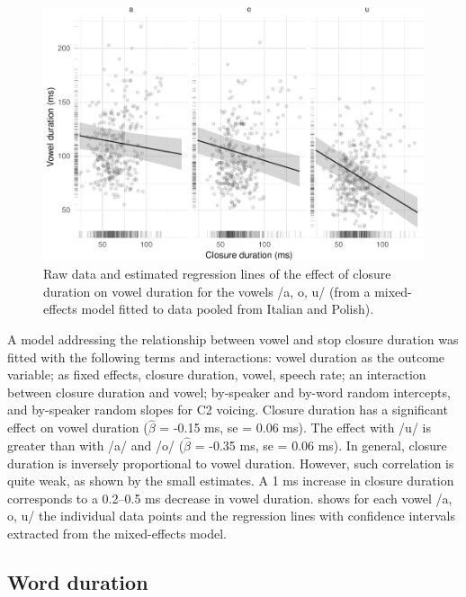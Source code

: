 \documentclass[preprint]{JASAnew}
\begin{document}
\begin{figure}
\includegraphics[width=\linewidth]{2018-jasa_files/figure-latex/vow-clo-plot-1} \caption{Raw data and estimated regression lines of the effect of closure duration on vowel duration for the vowels /a, o, u/ (from a mixed-effects model fitted to data pooled from Italian and Polish).}\label{f:vow-clo-plot}
\end{figure}

A model addressing the relationship between vowel and stop closure
duration was fitted with the following terms and interactions: vowel
duration as the outcome variable; as fixed effects, closure duration,
vowel, speech rate; an interaction between closure duration and vowel;
by-speaker and by-word random intercepts, and by-speaker random slopes
for C2 voicing. Closure duration has a significant effect on vowel
duration (\(\hat{\beta}\) = -0.15 ms, se = 0.06 ms). The effect with /u/
is greater than with /a/ and /o/ (\(\hat{\beta}\) = -0.35 ms, se = 0.06
ms). In general, closure duration is inversely proportional to vowel
duration. However, such correlation is quite weak, as shown by the small
estimates. A 1 ms increase in closure duration corresponds to a 0.2--0.5
ms decrease in vowel duration.  shows for each
vowel /a, o, u/ the individual data points and the regression lines with
confidence intervals extracted from the mixed-effects model.

\hypertarget{word-duration}{%
\subsection{Word duration}\label{word-duration}}
\end{document}

